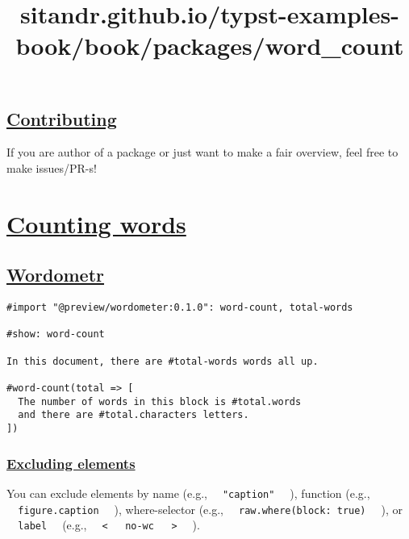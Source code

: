 \subsection{\texorpdfstring{\hyperref[contributing]{Contributing}}{Contributing}}\label{contributing}

If you are author of a package or just want to make a fair overview,
feel free to make issues/PR-s!


\title{sitandr.github.io/typst-examples-book/book/packages/word_count}

\section{\texorpdfstring{\hyperref[counting-words]{Counting
words}}{Counting words}}\label{counting-words}

\subsection{\texorpdfstring{\hyperref[wordometr]{Wordometr}}{Wordometr}}\label{wordometr}

\begin{verbatim}
#import "@preview/wordometer:0.1.0": word-count, total-words

#show: word-count

In this document, there are #total-words words all up.

#word-count(total => [
  The number of words in this block is #total.words
  and there are #total.characters letters.
])
\end{verbatim}

\pandocbounded{}

\subsubsection{\texorpdfstring{\hyperref[excluding-elements]{Excluding
elements}}{Excluding elements}}\label{excluding-elements}

You can exclude elements by name (e.g.,
\texttt{\ }{\texttt{\ "caption"\ }}\texttt{\ } ), function (e.g.,
\texttt{\ }{\texttt{\ figure.caption\ }}\texttt{\ } ), where-selector
(e.g., \texttt{\ }{\texttt{\ raw.where(block:\ true)\ }}\texttt{\ } ),
or \texttt{\ }{\texttt{\ label\ }}\texttt{\ } (e.g.,
\texttt{\ }{\texttt{\ \textless{}\ }}\texttt{\ }{\texttt{\ no-wc\ }}\texttt{\ }{\texttt{\ \textgreater{}\ }}\texttt{\ }
).

